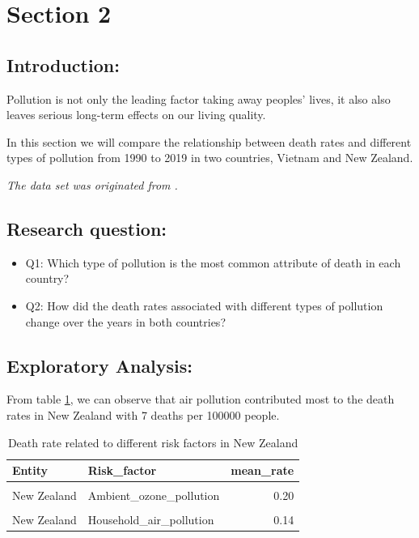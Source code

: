 \documentclass[11pt,a4paper,]{article}
\begin{document}
\hypertarget{section-2}{%
\section{Section 2}\label{section-2}}

\hypertarget{introduction-1}{%
\subsection{Introduction:}\label{introduction-1}}

Pollution is not only the leading factor taking away peoples' lives, it also also leaves serious long-term effects on our living quality.

In this section we will compare the relationship between death rates and different types of pollution from 1990 to 2019 in two countries, Vietnam and New Zealand.

\emph{The data set was originated from \textcite{owidairpollution}.}

\hypertarget{research-question-1}{%
\subsection{Research question:}\label{research-question-1}}

\begin{itemize}
\item
  Q1: Which type of pollution is the most common attribute of death in each country?
\item
  Q2: How did the death rates associated with different types of pollution change over the years in both countries?
\end{itemize}

\hypertarget{exploratory-analysis}{%
\subsection{Exploratory Analysis:}\label{exploratory-analysis}}

From table \ref{tab:nz}, we can observe that air pollution contributed most to the death rates in New Zealand with 7 deaths per 100000 people.

\begin{table}[!h]

\caption{\label{tab:nz}Death rate related to different risk factors in New Zealand}
\centering
\begin{tabular}[t]{llr}
\toprule
Entity & Risk\_factor & mean\_rate\\
\midrule
\cellcolor{gray!6}{New Zealand} & \cellcolor{gray!6}{Air\_pollution} & \cellcolor{gray!6}{7.11}\\
New Zealand & Ambient\_ozone\_pollution & 0.20\\
\cellcolor{gray!6}{New Zealand} & \cellcolor{gray!6}{Ambient\_particulate\_matter\_pollution} & \cellcolor{gray!6}{6.77}\\
New Zealand & Household\_air\_pollution & 0.14\\
\bottomrule
\end{tabular}
\end{table}
\end{document}
